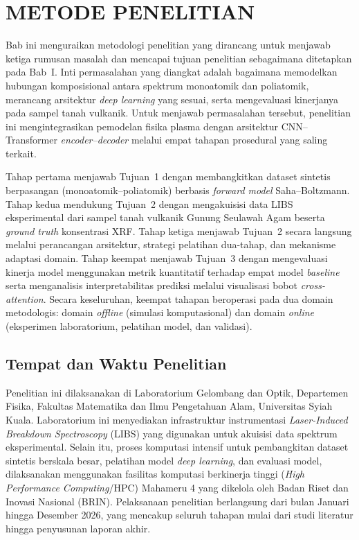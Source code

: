 
\chapter{METODE PENELITIAN}

Bab ini menguraikan metodologi penelitian yang dirancang untuk menjawab ketiga rumusan masalah dan mencapai tujuan penelitian sebagaimana ditetapkan pada Bab~I. Inti permasalahan yang diangkat adalah bagaimana memodelkan hubungan komposisional antara spektrum monoatomik dan poliatomik, merancang arsitektur \textit{deep learning} yang sesuai, serta mengevaluasi kinerjanya pada sampel tanah vulkanik. Untuk menjawab permasalahan tersebut, penelitian ini mengintegrasikan pemodelan fisika plasma dengan arsitektur CNN--Transformer \textit{encoder--decoder} melalui empat tahapan prosedural yang saling terkait.

Tahap pertama menjawab Tujuan~1 dengan membangkitkan dataset sintetis berpasangan (monoatomik--poliatomik) berbasis \textit{forward model} Saha--Boltzmann. Tahap kedua mendukung Tujuan~2 dengan mengakuisisi data LIBS eksperimental dari sampel tanah vulkanik Gunung Seulawah Agam beserta \textit{ground truth} konsentrasi XRF. Tahap ketiga menjawab Tujuan~2 secara langsung melalui perancangan arsitektur, strategi pelatihan dua-tahap, dan mekanisme adaptasi domain. Tahap keempat menjawab Tujuan~3 dengan mengevaluasi kinerja model menggunakan metrik kuantitatif terhadap empat model \textit{baseline} serta menganalisis interpretabilitas prediksi melalui visualisasi bobot \textit{cross-attention}. Secara keseluruhan, keempat tahapan beroperasi pada dua domain metodologis: domain \textit{offline} (simulasi komputasional) dan domain \textit{online} (eksperimen laboratorium, pelatihan model, dan validasi).

\section{Tempat dan Waktu Penelitian}
Penelitian ini dilaksanakan di Laboratorium Gelombang dan Optik, Departemen Fisika, Fakultas Matematika dan Ilmu Pengetahuan Alam, Universitas Syiah Kuala. Laboratorium ini menyediakan infrastruktur instrumentasi \textit{Laser-Induced Breakdown Spectroscopy} (LIBS) yang digunakan untuk akuisisi data spektrum eksperimental. Selain itu, proses komputasi intensif untuk pembangkitan dataset sintetis berskala besar, pelatihan model \textit{deep learning}, dan evaluasi model, dilaksanakan menggunakan fasilitas komputasi berkinerja tinggi (\textit{High Performance Computing}/HPC) Mahameru 4 yang dikelola oleh Badan Riset dan Inovasi Nasional (BRIN). Pelaksanaan penelitian berlangsung dari bulan Januari hingga Desember 2026, yang mencakup seluruh tahapan mulai dari studi literatur hingga penyusunan laporan akhir.

